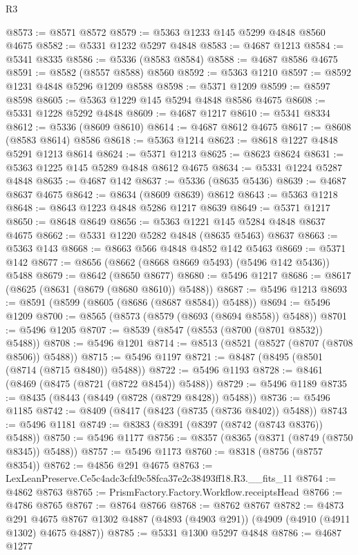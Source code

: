 \begin{lexlean}{R3}
\begin{coremodule}
@8573 := @8571 @8572
@8579 := @5363 @1233 @145 @5299 @4848 @8560 @4675
@8582 := @5331 @1232 @5297 @4848
@8583 := @4687 @1213
@8584 := @5341 @8335
@8586 := @5336 (@8583 @8584)
@8588 := @4687 @8586 @4675
@8591 := @8582 (@8557 @8588) @8560
@8592 := @5363 @1210
@8597 := @8592 @1231 @4848 @5296 @1209 @8588
@8598 := @5371 @1209
@8599 := @8597 @8598
@8605 := @5363 @1229 @145 @5294 @4848 @8586 @4675
@8608 := @5331 @1228 @5292 @4848
@8609 := @4687 @1217
@8610 := @5341 @8334
@8612 := @5336 (@8609 @8610)
@8614 := @4687 @8612 @4675
@8617 := @8608 (@8583 @8614) @8586
@8618 := @5363 @1214
@8623 := @8618 @1227 @4848 @5291 @1213 @8614
@8624 := @5371 @1213
@8625 := @8623 @8624
@8631 := @5363 @1225 @145 @5289 @4848 @8612 @4675
@8634 := @5331 @1224 @5287 @4848
@8635 := @4687 @142
@8637 := @5336 (@8635 @5436)
@8639 := @4687 @8637 @4675
@8642 := @8634 (@8609 @8639) @8612
@8643 := @5363 @1218
@8648 := @8643 @1223 @4848 @5286 @1217 @8639
@8649 := @5371 @1217
@8650 := @8648 @8649
@8656 := @5363 @1221 @145 @5284 @4848 @8637 @4675
@8662 := @5331 @1220 @5282 @4848 (@8635 @5463) @8637
@8663 := @5363 @143
@8668 := @8663 @566 @4848 @4852 @142 @5463
@8669 := @5371 @142
@8677 := @8656 (@8662 (@8668 @8669 @5493) (@5496 @142 @5436)) @5488
@8679 := @8642 (@8650 @8677)
@8680 := @5496 @1217
@8686 := @8617 (@8625 (@8631 (@8679 (@8680 @8610)) @5488))
@8687 := @5496 @1213
@8693 := @8591 (@8599 (@8605 (@8686 (@8687 @8584)) @5488))
@8694 := @5496 @1209
@8700 := @8565 (@8573 (@8579 (@8693 (@8694 @8558)) @5488))
@8701 := @5496 @1205
@8707 := @8539 (@8547 (@8553 (@8700 (@8701 @8532)) @5488))
@8708 := @5496 @1201
@8714 := @8513 (@8521 (@8527 (@8707 (@8708 @8506)) @5488))
@8715 := @5496 @1197
@8721 := @8487 (@8495 (@8501 (@8714 (@8715 @8480)) @5488))
@8722 := @5496 @1193
@8728 := @8461 (@8469 (@8475 (@8721 (@8722 @8454)) @5488))
@8729 := @5496 @1189
@8735 := @8435 (@8443 (@8449 (@8728 (@8729 @8428)) @5488))
@8736 := @5496 @1185
@8742 := @8409 (@8417 (@8423 (@8735 (@8736 @8402)) @5488))
@8743 := @5496 @1181
@8749 := @8383 (@8391 (@8397 (@8742 (@8743 @8376)) @5488))
@8750 := @5496 @1177
@8756 := @8357 (@8365 (@8371 (@8749 (@8750 @8345)) @5488))
@8757 := @5496 @1173
@8760 := @8318 (@8756 (@8757 @8354))
@8762 := @4856 @291 @4675
@8763 := LexLeanPreserve.Ce5c4adc3cfd9c58fca37e2c38493ff18.R3.__fits_11
@8764 := @4862 @8763
@8765 := PrismFactory.Factory.Workflow.receiptsHead
@8766 := @4786 @8765
@8767 := @8764 @8766
@8768 := @8762 @8767
@8782 := @4873
    @291
    @4675
    @8767
    @1302
    @4887
    (@4893 (@4903 @291))
    (@4909 (@4910 (@4911 @1302) @4675 @4887))
@8785 := @5331 @1300 @5297 @4848
@8786 := @4687 @1277

\end{coremodule}
\end{lexlean}
